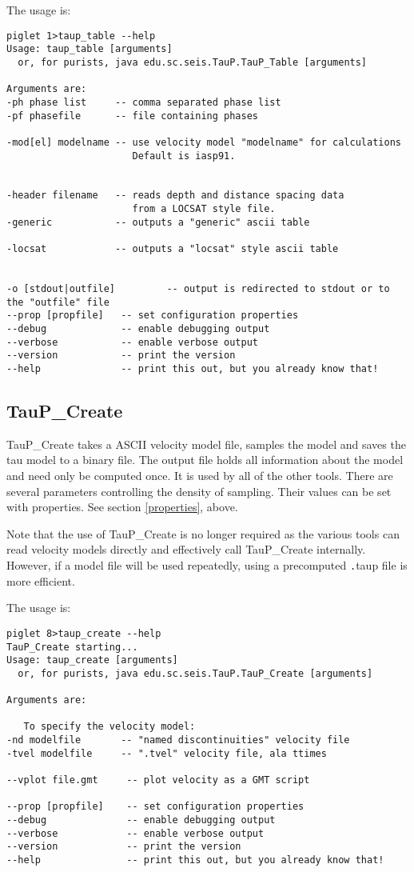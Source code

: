 The usage is:
\begin{verbatim}
piglet 1>taup_table --help
Usage: taup_table [arguments]
  or, for purists, java edu.sc.seis.TauP.TauP_Table [arguments]

Arguments are:
-ph phase list     -- comma separated phase list
-pf phasefile      -- file containing phases

-mod[el] modelname -- use velocity model "modelname" for calculations
                      Default is iasp91.


-header filename   -- reads depth and distance spacing data
                      from a LOCSAT style file.
-generic           -- outputs a "generic" ascii table

-locsat            -- outputs a "locsat" style ascii table


-o [stdout|outfile]         -- output is redirected to stdout or to the "outfile" file
--prop [propfile]   -- set configuration properties
--debug             -- enable debugging output
--verbose           -- enable verbose output
--version           -- print the version
--help              -- print this out, but you already know that!
\end{verbatim}

\subsection{TauP\_Create}

TauP\_Create takes a ASCII velocity model file, samples the model
 and saves the tau model to a binary file. 
The output file holds all 
information about the model and need only be computed once. It
is used by all of the other tools. There are several parameters controlling
the density of sampling. Their values can be set with properties. See section
\ref{properties}, above.

Note that the use of TauP\_Create is no longer required as the various tools can read velocity models directly
and effectively call TauP\_Create internally. However, if a model file will be used repeatedly, using a
precomputed {\texttt .taup} file is more efficient.

The usage is:
\begin{verbatim}
piglet 8>taup_create --help
TauP_Create starting...
Usage: taup_create [arguments]
  or, for purists, java edu.sc.seis.TauP.TauP_Create [arguments]

Arguments are:

   To specify the velocity model:
-nd modelfile       -- "named discontinuities" velocity file
-tvel modelfile     -- ".tvel" velocity file, ala ttimes

--vplot file.gmt     -- plot velocity as a GMT script

--prop [propfile]    -- set configuration properties
--debug              -- enable debugging output
--verbose            -- enable verbose output
--version            -- print the version
--help               -- print this out, but you already know that!
\end{verbatim} 
 
